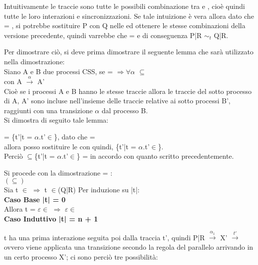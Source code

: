 Intuitivamente le traccie  sono tutte le possibili combinazione tra  e , cioè quindi tutte le loro interazioni e sincronizzazioni. Se tale intuizione è vera allora dato che  = , si potrebbe sostituire P con Q nelle  ed ottenere le stesse combinazioni della versione precedente, quindi varrebbe che  =  e di conseguenza P|R $\sim_{t}$ Q|R.

Per dimostrare ciò, si deve prima dimostrare il seguente lemma che sarà utilizzato nella dimostrazione:\\
Siano A e B due processi CSS, se  =  $\Rightarrow \forall\alpha$ $\subseteq$ \\con A $ \overset{\alpha}\rightarrow $ A'\\
Cioè se i processi A e B hanno le stesse traccie allora le traccie del sotto processo di A, A' sono incluse nell'insieme delle traccie relative ai sotto processi B', raggiunti con una transizione $\alpha$ dal processo B.\\

Si dimostra di seguito tale lemma:

 = \{t'|t = $\alpha$.t'$\in$\}, dato che  =  \\
allora posso sostituire le  con  quindi, \{t'|t = $\alpha$.t'$\in$\}.\\
Perciò $\subseteq$\{t'|t = $\alpha$.t'$\in$\} =  in accordo con quanto scritto precedentemente.

Si procede con la dimostrazione  = :\\

$(\subseteq)$ 
\\

Sia t $\in$  $\Rightarrow$  t $\in$(Q|R)
Per induzione su |t|:\\

\textbf{Caso Base |t| = 0}
\\
Allora t = $\varepsilon \in$ $\Rightarrow$ $\varepsilon \in$
\\

\textbf{Caso Induttivo |t| = n + 1}

t ha una prima interazione seguita poi dalla traccia t', quindi P|R $ \overset{\alpha_{1}}\rightarrow $ X' $\overset{t'}\rightarrow$ ovvero viene applicata una transizione secondo la regola del parallelo arrivando in un certo processo X'; ci sono perciò tre possibilità:

